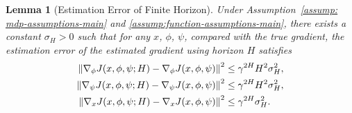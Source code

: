 \documentclass{article}
\theoremstyle{plain}
\newtheorem{lemma}{Lemma}
\theoremstyle{definition}
\theoremstyle{remark}
\begin{document}
\begin{lemma}[Estimation Error of Finite Horizon]
    \label{lemma: error-of-policy-gradient-estimation-of-finite-horizon}
    Under Assumption~\ref{assump: mdp-assumptions-main} and \ref{assump:function-assumptions-main}, there exists a constant $\sigma_H>0$ such that for any $x$, $\phi$, $\psi$, compared with the true gradient, the estimation error of the estimated gradient using horizon $H$ satisfies 
    \begin{align}
         \left\| \nabla_\phi J(x,\phi,\psi; H) - \nabla_\phi J(x,\phi,\psi) \right\|^2  &\leq \gamma^{2H} H^2 \sigma_H^2 ,\notag \\
         \left\| \nabla_\psi J(x,\phi,\psi; H) - \nabla_\psi J(x,\phi,\psi) \right\|^2  &\leq \gamma^{2H} H^2 \sigma_H^2,\notag \\
         \left\| \nabla_x J(x,\phi,\psi; H) - \nabla_x J(x,\phi,\psi) \right\|^2  &\leq \gamma^{2H} \sigma_H^2.\notag
    \end{align} 
\end{lemma}
\end{document}
